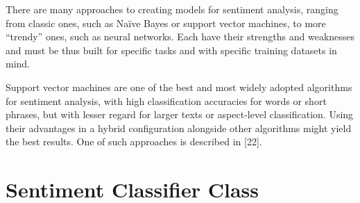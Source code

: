 \documentclass[12pt,journal,compsoc]{IEEEtran}
\begin{document}
There are many approaches to creating models for sentiment analysis, ranging from classic ones, such as Naïve Bayes or support vector machines, to more “trendy” ones, such as neural networks. Each have their strengths and weaknesses and must be thus built for specific tasks and with specific training datasets in mind.

Support vector machines are one of the best and most widely adopted algorithms for sentiment analysis, with high classification accuracies for words or short phrases, but with lesser regard for larger texts or aspect-level classification. Using their advantages in a hybrid configuration alongside other algorithms might yield the best results. One of such approaches is described in [22].

\appendices
\section{Sentiment Classifier Class}
\end{document}
